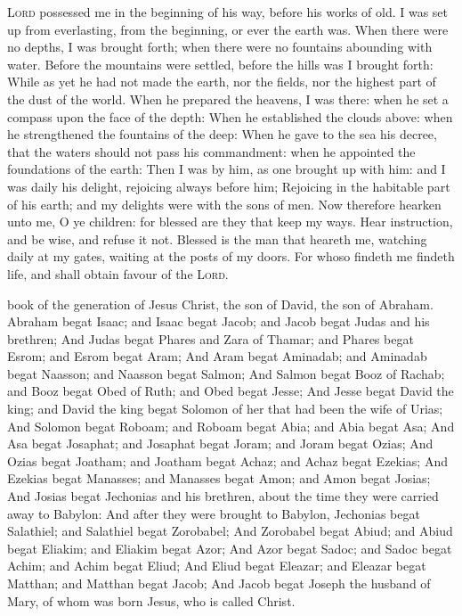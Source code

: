  \textsc{Lord} possessed me in the beginning of his way, before his works of old. I was set up from everlasting, from the beginning, or ever the earth was. When there were no depths, I was brought forth; when there were no fountains abounding with water. Before the mountains were settled, before the hills was I brought forth: While as yet he had not made the earth, nor the fields, nor the highest part of the dust of the world. When he prepared the heavens, I was there: when he set a compass upon the face of the depth: When he established the clouds above: when he strengthened the fountains of the deep: When he gave to the sea his decree, that the waters should not pass his commandment: when he appointed the foundations of the earth: Then I was by him, as one brought up with him: and I was daily his delight, rejoicing always before him; Rejoicing in the habitable part of his earth; and my delights were with the sons of men. Now therefore hearken unto me, O ye children: for blessed are they that keep my ways. Hear instruction, and be wise, and refuse it not. Blessed is the man that heareth me, watching daily at my gates, waiting at the posts of my doors. For whoso findeth me findeth life, and shall obtain favour of the \textsc{Lord}.


 book of the generation of Jesus Christ, the son of David, the son of Abraham. Abraham begat Isaac; and Isaac begat Jacob; and Jacob begat Judas and his brethren; And Judas begat Phares and Zara of Thamar; and Phares begat Esrom; and Esrom begat Aram; And Aram begat Aminadab; and Aminadab begat Naasson; and Naasson begat Salmon; And Salmon begat Booz of Rachab; and Booz begat Obed of Ruth; and Obed begat Jesse; And Jesse begat David the king; and David the king begat Solomon of her that had been the wife of Urias; And Solomon begat Roboam; and Roboam begat Abia; and Abia begat Asa; And Asa begat Josaphat; and Josaphat begat Joram; and Joram begat Ozias; And Ozias begat Joatham; and Joatham begat Achaz; and Achaz begat Ezekias; And Ezekias begat Manasses; and Manasses begat Amon; and Amon begat Josias; And Josias begat Jechonias and his brethren, about the time they were carried away to Babylon: And after they were brought to Babylon, Jechonias begat Salathiel; and Salathiel begat Zorobabel; And Zorobabel begat Abiud; and Abiud begat Eliakim; and Eliakim begat Azor; And Azor begat Sadoc; and Sadoc begat Achim; and Achim begat Eliud; And Eliud begat Eleazar; and Eleazar begat Matthan; and Matthan begat Jacob; And Jacob begat Joseph the husband of Mary, of whom was born Jesus, who is called Christ.

